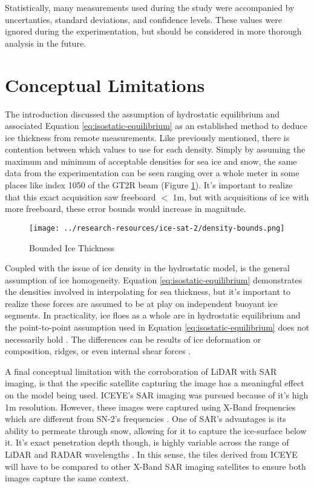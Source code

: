 Statistically, many measurements used during the study were accompanied by uncertanties, standard deviations, and confidence levels. These values were ignored during the experimentation, but should be considered in more thorough analysis in the future. 

\section{Conceptual Limitations}
The introduction discussed the assumption of hydrostatic equilibrium and associated Equation \ref{eq:isostatic-equilibrium} as an established method to deduce ice thickness from remote measurements. Like previously mentioned, there is contention between which values to use for each density. Simply by assuming the maximum and minimum of acceptable densities for sea ice and snow, the same data from the experimentation can be seen ranging over a whole meter in some places like index 1050 of the GT2R beam (Figure \ref{fig:density-bounds}). It's important to realize that this exact acquisition saw freeboard $<$ 1m, but with acquisitions of ice with more freeboard, these error bounds would increase in magnitude.

\begin{figure}[h]
	\centering
	\texttt{[image: ../research-resources/ice-sat-2/density-bounds.png]}
	\caption[Effect of Density Estimations on Ice Thickness Interpolation]{Bounded Ice Thickness}
	\label{fig:density-bounds}
\end{figure}

Coupled with the issue of ice density in the hydrostatic model, is the general assumption of ice homogeneity. Equation \ref{eq:isostatic-equilibrium} demonstrates the densities involved in interpolating for sea thickness, but it's important to realize these forces are assumed to be at play on independent buoyant ice segments. In practicality, ice floes as a whole are in hydrostatic equilibrium and the point-to-point assumption used in Equation \ref{eq:isostatic-equilibrium} does not necessarily hold \cite{Forsström_Gerland_Pedersen_2011}. The differences can be results of ice deformation or composition, ridges, or even  internal shear forces \cite{Hutchings_Heil_Lecomte_Stevens_Steer_Lieser_2015,sea-ice-properties}. 

A final conceptual limitation with the corroboration of LiDAR with SAR imaging, is that the specific satellite capturing the image has a meaningful effect on the model being used. ICEYE's SAR imaging was pursued because of it's high 1m resolution. However, these images were captured using X-Band frequencies which are different from SN-2's frequencies \cite{iceye-products,Sentinel-2-Availability}. One of SAR's advantages is its ability to permeate through snow, allowing for it to capture the ice-surface below it. It's exact penetration depth though, is highly variable across the range of LiDAR and RADAR wavelengths \cite{remotesensingkinematics}. In this sense, the tiles derived from ICEYE will have to be compared to other X-Band SAR imaging satellites to ensure both images capture the same context.


